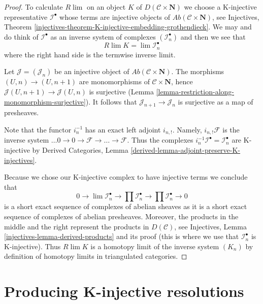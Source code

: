 \begin{proof}
To calculate $R\lim$ on an object $K$ of $D(\mathcal{C} \times \mathbf{N})$
we choose a K-injective representative $\mathcal{I}^\bullet$ whose terms are
injective objects of $\textit{Ab}(\mathcal{C} \times \mathbf{N})$, see
Injectives, Theorem
\ref{injectives-theorem-K-injective-embedding-grothendieck}.
We may and do think of $\mathcal{I}^\bullet$ as an inverse system of
complexes $(\mathcal{I}_n^\bullet)$ and then we see that
$$
R\lim K = \lim \mathcal{I}_n^\bullet
$$
where the right hand side is the termwise inverse limit.

\medskip\noindent
Let $\mathcal{J} = (\mathcal{J}_n)$ be an injective object of
$\textit{Ab}(\mathcal{C} \times \mathbf{N})$. The morphisms
$(U, n) \to (U, n + 1)$ are monomorphisms of
$\mathcal{C} \times \mathbf{N}$, hence
$\mathcal{J}(U, n + 1) \to \mathcal{J}(U, n)$ is surjective
(Lemma \ref{lemma-restriction-along-monomorphism-surjective}).
It follows that $\mathcal{J}_{n + 1} \to \mathcal{J}_n$ is
surjective as a map of presheaves.

\medskip\noindent
Note that the functor $i_n^{-1}$ has an exact left adjoint $i_{n, !}$.
Namely, $i_{n, !}\mathcal{F}$ is the inverse system
$\ldots 0 \to 0 \to \mathcal{F} \to \ldots \to \mathcal{F}$.
Thus the complexes $i_n^{-1}\mathcal{I}^\bullet = \mathcal{I}_n^\bullet$
are K-injective by
Derived Categories, Lemma \ref{derived-lemma-adjoint-preserve-K-injectives}.

\medskip\noindent
Because we chose our K-injective complex to have injective terms
we conclude that
$$
0 \to  \lim \mathcal{I}_n^\bullet \to \prod \mathcal{I}_n^\bullet
\to \prod \mathcal{I}_n^\bullet \to 0
$$
is a short exact sequence of complexes of abelian sheaves as it
is a short exact sequence of complexes of abelian presheaves.
Moreover, the products in the middle and the right represent
the products in $D(\mathcal{C})$, see
Injectives, Lemma \ref{injectives-lemma-derived-products} and its
proof (this is where we use that $\mathcal{I}_n^\bullet$ is K-injective).
Thus $R\lim K$ is a homotopy limit of the inverse system $(K_n)$
by definition of homotopy limits in triangulated categories.
\end{proof}








\section{Producing K-injective resolutions}
\label{section-K-injective}

